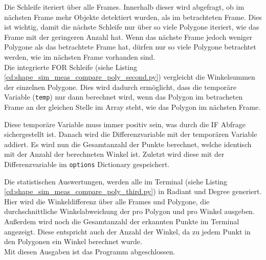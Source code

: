{	Die Schleife iteriert über alle Frames. Innerhalb dieser wird abgefragt, ob im nächsten Frame mehr Objekte detektiert wurden, als im betrachteten Frame. Dies ist wichtig, damit die nächste Schleife nur über so viele Polygone iteriert, wie das Frame mit der geringeren Anzahl hat. Wenn das nächste Frame jedoch weniger Polygone als das betrachtete Frame hat, dürfen nur so viele Polygone betrachtet werden, wie im nächsten Frame vorhanden sind. \\
	
	Die integrierte FOR Schleife (siehe Listing \ref{cd:shape_sim_meas_compare_poly_second.py}) vergleicht die Winkelsummen der einzelnen Polygone. Dies wird dadurch ermöglicht, dass die temporäre Variable (\lstinline|temp|) nur dann berechnet wird, wenn das Polygon im betracheten Frame an der gleichen Stelle im Array steht, wie das Polygon im nächsten Frame. 
	
	Diese temporäre Variable muss immer positiv sein, was durch die IF Abfrage sichergestellt ist. Danach wird die Differenzvariable mit der temporären Variable addiert. Es wird nun die Gesamtanzahl der Punkte berechnet, welche identisch mit der Anzahl der berechneten Winkel ist. Zuletzt wird diese mit der Differenzvariable im \lstinline|options| Dictionary gespeichert. 
	 
	Die statistischen Auswertungen, werden alle im Terminal (siehe Listing \ref{cd:shape_sim_meas_compare_poly_third.py}) in Radiant und Degree generiert. Hier wird  die Winkeldifferenz über alle Frames und Polygone, die durchschnittliche Winkelabweichung der pro Polygon und pro Winkel ausgeben. Außerdem wird noch die Gesamtanzahl der erkannten Punkte im Terminal angezeigt. Diese entspricht auch der Anzahl der Winkel, da zu jedem Punkt in den Polygonen ein Winkel berechnet wurde. \\
	Mit diesen Ausgaben ist das Programm abgeschlossen.

}







